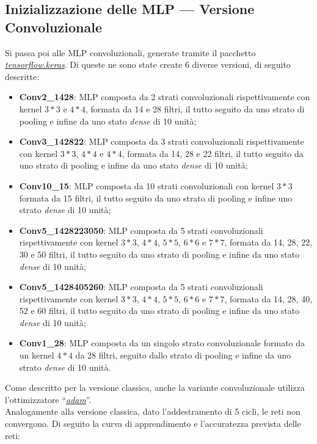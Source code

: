 \documentclass[12pt, a4paper]{article}
\begin{document}
\subsection{Inizializzazione delle MLP --- Versione Convoluzionale}
Si passa poi alle MLP convoluzionali, generate tramite il pacchetto \href{https://www.tensorflow.org/api_docs/python/tf/keras/Model}{\textit{tensorflow.keras}}. Di queste ne sono state create 6 diverse versioni, di seguito descritte:
\begin{itemize}
    \item \textbf{Conv2\_1428}: MLP composta da 2 strati convoluzionali rispettivamente con kernel \(3*3\) e \(4*4\), formata da 14 e 28 filtri, il tutto seguito da uno strato di pooling e infine da uno stato \textit{dense} di 10 unità;
    \item \textbf{Conv3\_142822}: MLP composta da 3 strati convoluzionali rispettivamente con kernel \(3*3\), \(4*4\) e \(4*4\), formata da 14, 28 e 22 filtri, il tutto seguito da uno strato di pooling e infine da uno stato \textit{dense} di 10 unità;
    \item \textbf{Conv10\_15}: MLP composta da 10 strati convoluzionali con kernel \(3*3\) formata da 15 filtri, il tutto seguito da uno strato di pooling e infine uno strato \textit{dense} di 10 unità; 
    \item \textbf{Conv5\_1428223050}: MLP composta da 5 strati convoluzionali rispettivamente con kernel \(3*3\), \(4*4\), \(5*5\), \(6*6\) e \(7*7\), formata da 14, 28, 22, 30 e 50 filtri, il tutto seguito da uno strato di pooling e infine da uno stato \textit{dense} di 10 unità;
    \item \textbf{Conv5\_1428405260}: MLP composta da 5 strati convoluzionali rispettivamente con kernel \(3*3\), \(4*4\), \(5*5\), \(6*6\) e \(7*7\), formata da 14, 28, 40, 52 e 60 filtri, il tutto seguito da uno strato di pooling e infine da uno stato \textit{dense} di 10 unità;
    \item \textbf{Conv1\_28}: MLP composta da un singolo strato convoluzionale formato da un kernel \(4*4\) da 28 filtri, seguito dallo strato di pooling e infine da uno strato \textit{dense} di 10 unità.
\end{itemize}
Come descritto per la versione classica, anche la variante convoluzionale utilizza l'ottimizzatore “\href{https://arxiv.org/abs/1412.6980}{\textit{adam}}”.\\
Analogamente alla versione classica, dato l'addestramento di 5 cicli, le reti non convergono. Di seguito la curva di apprendimento e l'accuratezza prevista delle reti:
\end{document}
